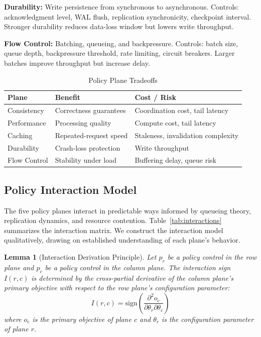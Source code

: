 \documentclass[conference]{IEEEtran}
\newtheorem{lemma}[theorem]{Lemma}
\begin{document}
\textbf{Durability:} Write persistence from synchronous to asynchronous. Controls: acknowledgment level, WAL flush, replication synchronicity, checkpoint interval. Stronger durability reduces data-loss window but lowers write throughput.


\textbf{Flow Control:} Batching, queueing, and backpressure. Controls: batch size, queue depth, backpressure threshold, rate limiting, circuit breakers. Larger batches improve throughput but increase delay.

\begin{table}[t]
\caption{Policy Plane Tradeoffs}
\label{tab:planes}
\centering
\small
\begin{tabular}{@{}l l l@{}}
\toprule
\textbf{Plane} & \textbf{Benefit} & \textbf{Cost / Risk} \\
\midrule
Consistency & Correctness guarantees & Coordination cost, tail latency \\
Performance & Processing quality & Compute cost, tail latency \\
Caching & Repeated-request speed & Staleness, invalidation complexity \\
Durability & Crash-loss protection & Write throughput \\
Flow Control & Stability under load & Buffering delay, queue risk \\
\bottomrule
\end{tabular}
\end{table}

\subsection{Policy Interaction Model}


The five policy planes interact in predictable ways informed by queueing theory, replication dynamics, and resource contention. Table~\ref{tab:interactions} summarizes the interaction matrix. We construct the interaction model qualitatively, drawing on established understanding of each plane's behavior.

\begin{lemma}[Interaction Derivation Principle]
Let $p_r$ be a policy control in the row plane and $p_c$ be a policy control in the column plane. The interaction sign $I(r,c)$ is determined by the cross-partial derivative of the column plane's primary objective with respect to the row plane's configuration parameter:
\begin{equation}
I(r,c) = \text{sign}\left(\frac{\partial^2 o_c}{\partial \theta_r \partial \theta_c}\right)
\label{eq:interaction}
\end{equation}
where $o_c$ is the primary objective of plane $c$ and $\theta_r$ is the configuration parameter of plane $r$.
\end{lemma}
\end{document}
